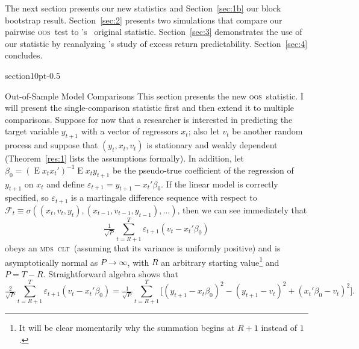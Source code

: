 \documentclass[11pt,fleqn]{article}
\makeatletter
\newcommand\citepos[2][]{\citeauthor{#2}'s \citeyearpar[#1]{#2}}
\newcommand\poscw{\citeauthor{ClW:06}'s \citeyearpar{ClW:06,ClW:07}}
\renewcommand\section{\@startsection%
{section}{1}{0pt}{-\baselineskip}{0.5\baselineskip}%
{\normalfont\normalsize\bfseries\large\raggedright}}
\theoremstyle{definition}
\DeclareMathOperator{\E}{E}
\newcommand{\clt}{\textsc{clt}}
\newcommand{\mds}{\textsc{mds}}
\newcommand{\oos}{\textsc{oos}}
\makeatother
\begin{document}
The next section presents our new statistics and Section~\ref{sec:1b}
our block bootstrap result.  Section~\ref{sec:2} presents two
simulations that compare our pairwise \oos\ test to \poscw\ original
statistic.  Section~\ref{sec:3} demonstrates the use of our statistic
by reanalyzing \citepos{GoW:08} study of excess return
predictability. Section~\ref{sec:4} concludes.

\section{Out-of-Sample Model Comparisons}\label{sec:1}
This section presents the new \oos\ statistic.  I will present the
single-comparison statistic first and then extend it to multiple
comparisons.  Suppose for now that a researcher is interested in
predicting the target variable $y_{t+1}$ with a vector of regressors
$x_t$; also let $v_t$ be another random process and suppose that
$(y_t, x_t, v_t)$ is stationary and weakly dependent
(Theorem~\ref{res:1} lists the assumptions formally).  In addition,
let $\beta_0 = (\E x_t x_t')^{-1} \E x_t y_{t+1}$ be the pseudo-true
coefficient of the regression of $y_{t+1}$ on $x_t$ and define
$\varepsilon_{t+1} = y_{t+1} - x_t'\beta_0$.  If the linear model is
correctly specified, so $\varepsilon_{t+1}$ is a martingale difference
sequence with respect to $\mathcal{F}_t \equiv \sigma((x_t, v_t, y_t),
(x_{t-1}, v_{t-1}, y_{t-1}),\dots)$, then we can see immediately that
\begin{equation}
  \label{eq:4}
  \tfrac{1}{\sqrt{P}} \sum_{t=R+1}^T \varepsilon_{t+1} (v_t - x_t'\beta_0)
\end{equation}
obeys an \mds\ \clt\ (assuming that its variance is uniformly
positive) and is asymptotically normal as $P \to \infty$, with $R$ an
arbitrary starting value\footnote{It will be clear momentarily why the
  summation begins at $R+1$ instead of $1$.} and $P = T - R$.
Straightforward algebra \citep{ClW:07} shows that
\begin{equation}
  \label{eq:5}
  \tfrac{2}{\sqrt{P}} \sum_{t=R+1}^T \varepsilon_{t+1} (v_t -
  x_t'\beta_0) = \tfrac{1}{\sqrt{P}} \sum_{t=R+1}^T \Big[(y_{t+1} - 
  x_t\beta_0)^2 - (y_{t+1} - v_t)^2 + (x_t'\beta_0 - v_t)^2 \Big].
\end{equation}
\end{document}
